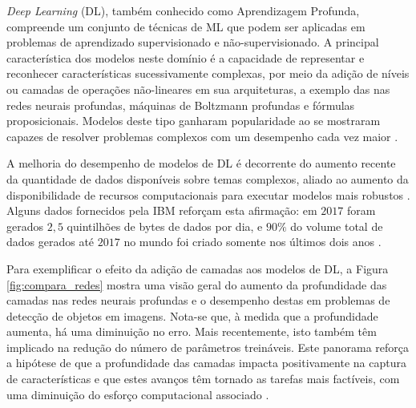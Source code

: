 
\emph{Deep Learning} (DL), também conhecido como Aprendizagem Profunda, compreende um conjunto de técnicas de ML que podem ser aplicadas em problemas de aprendizado supervisionado e não-supervisionado. A principal característica dos modelos neste domínio é a capacidade de representar e reconhecer características sucessivamente complexas, por meio da adição de níveis ou camadas de operações não-lineares em sua arquiteturas, a exemplo das nas redes neurais profundas, máquinas de Boltzmann profundas e fórmulas proposicionais. Modelos deste tipo ganharam popularidade ao se mostraram capazes de resolver problemas complexos com um desempenho cada vez maior \cite{bengio2009learning}.


A melhoria do desempenho de modelos de DL é decorrente do aumento recente da quantidade de dados disponíveis sobre temas complexos, aliado ao aumento da disponibilidade de recursos computacionais para executar modelos mais robustos \cite{goodfellow2016deep,deng2014deep}. Alguns dados fornecidos pela IBM reforçam esta afirmação: em $2017$ foram gerados $2,5$ quintilhões de bytes de dados por dia, e $90\%$ do volume total de dados gerados até $2017$ no mundo foi criado somente nos últimos dois anos \cite{ibm2017bigdata}.

Para exemplificar o efeito da adição de camadas aos modelos de DL, a Figura \ref{fig:compara_redes} mostra uma visão geral do aumento da profundidade das camadas nas redes neurais profundas e o desempenho destas em problemas de detecção de objetos em imagens. Nota-se que, à medida que a profundidade aumenta, há uma diminuição no erro. Mais recentemente, isto também têm implicado na redução do número de parâmetros treináveis.  Este panorama reforça a hipótese de que a profundidade das camadas impacta positivamente na captura de características e que estes avanços têm tornado as tarefas mais factíveis, com uma diminuição do esforço computacional associado  .


